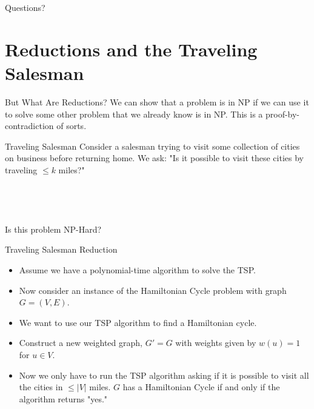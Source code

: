 \documentclass[aspectratio=169, handout]{beamer}
\begin{document}
\begin{frame}{}
      \begin{center}
    {\color{sigma@mainblue} \LARGE Questions?}
  \end{center}
\end{frame}


\section{Reductions and the Traveling Salesman}
\frame{\sectionpage}

\begin{frame}{But What Are Reductions?}
    We can show that a problem is in NP if we can use it to solve some other problem that we already know is in NP. This is a proof-by-contradiction of sorts.
\end{frame}

\begin{frame}{Traveling Salesman}
    Consider a salesman trying to visit some collection of cities on business before returning home. We ask: "Is it possible to visit these cities by traveling $\le k$ miles?"
    \\\\\\\\\\
    Is this problem NP-Hard?
\end{frame}

\begin{frame}{Traveling Salesman Reduction}
    \begin{itemize}
        \item Assume we have a polynomial-time algorithm to solve the TSP. \pause
        \item Now consider an instance of the Hamiltonian Cycle problem with graph $G = (V, E)$. \pause
        \item We want to use our TSP algorithm to find a Hamiltonian cycle. \pause
        \item Construct a new weighted graph, $G' = G$ with weights given by $w(u) = 1$ for $u \in V$. \pause
        \item Now we only have to run the TSP algorithm asking if it is possible to visit all the cities in $\le |V|$ miles. $G$ has a Hamiltonian Cycle if and only if the algorithm returns "yes."
    \end{itemize}
\end{frame}
\end{document}

